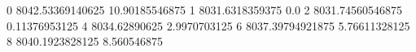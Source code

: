 0 8042.53369140625 10.90185546875
1 8031.6318359375 0.0
2 8031.74560546875 0.11376953125
4 8034.62890625 2.9970703125
6 8037.39794921875 5.76611328125
8 8040.1923828125 8.560546875
